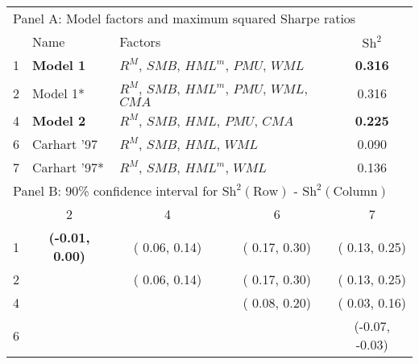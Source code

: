 
\begin{tabular}{lcccc}
  \toprule
  \multicolumn{5}{l}{Panel A: Model factors and maximum squared Sharpe ratios} \\
        & \multicolumn{1}{l}{Name}                         & \multicolumn{2}{l}{Factors}                                    & $\text{Sh}^2$   \\
  1     & \multicolumn{1}{l}{\textbf{Model 1}}             & \multicolumn{2}{l}{\footnotesize{$R^M$, $SMB$, $HML^m$, $PMU$, $WML$}}        & \textbf{0.316} \\
  2     & \multicolumn{1}{l}{Model 1*}              & \multicolumn{2}{l}{\footnotesize{$R^M$, $SMB$, $HML^m$, $PMU$, $WML$, $CMA$}} & 0.316 \\
  4     & \multicolumn{1}{l}{\textbf{Model 2}}             & \multicolumn{2}{l}{\footnotesize{$R^M$, $SMB$, $HML$, $PMU$, $CMA$}}          & \textbf{0.225} \\
  6     & \multicolumn{1}{l}{Carhart '97}               & \multicolumn{2}{l}{\footnotesize{$R^M$, $SMB$, $HML$, $WML$}}                 & 0.090 \\
  7     & \multicolumn{1}{l}{Carhart '97*}     & \multicolumn{2}{l}{\footnotesize{$R^M$, $SMB$, $HML^m$, $WML$}}               & 0.136 \\
  \midrule
  \multicolumn{5}{l}{Panel B: 90\% confidence interval for $\text{Sh}^2(\text{Row})$ - $\text{Sh}^2(\text{Column})$} \\
        &        2                &        4         &        6                &        7         \\
  1     & \textbf{(-0.01,  0.00)} & ( 0.06,  0.14)   & ( 0.17,  0.30)          & ( 0.13,  0.25) \\
  2     &                         & ( 0.06,  0.14)   & ( 0.17,  0.30)          & ( 0.13,  0.25) \\
  4     &                         &                  & ( 0.08,  0.20)          & ( 0.03,  0.16) \\
  6     &                         &                  &                         & (-0.07, -0.03) \\
  \bottomrule
\end{tabular}
